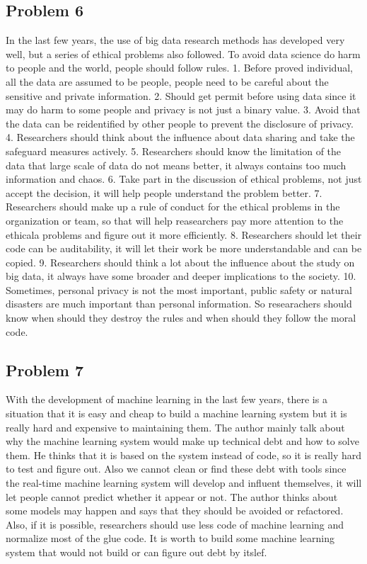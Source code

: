 \documentclass[12pt]{article}
\begin{document}
        \subsection{Problem 6}
			In the last few years, the use of big data research methods has developed very well, but a series of ethical
            problems also followed. To avoid data science do harm to people and the world, people should follow rules.
            1. Before proved individual, all the data are assumed to be people, people need to be careful about the sensitive
            and private information. 2. Should get permit before using data since it may do harm to some people and privacy is
            not just a binary value. 3. Avoid that the data can be reidentified by other people to prevent the disclosure of privacy.
            4. Researchers should think about the influence about data sharing and take the safeguard measures actively. 5. Researchers
            should know the limitation of the data that large scale of data do not means better, it always contains too much information
            and chaos. 6. Take part in the discussion of ethical problems, not just accept the decision, it will help people understand the
            problem better. 7. Researchers should make up a rule of conduct for the ethical problems in the organization or team, so that will
            help reasearchers pay more attention to the ethicala problems and figure out it more efficiently. 8. Researchers should let their
            code can be auditability, it will let their work be more understandable and can be copied. 9. Researchers should think a lot about
            the influence about the study on big data, it always have some broader and deeper implications to the society. 10. Sometimes,
            personal privacy is not the most important, public safety or natural disasters are much important than personal information.
            So researachers should know when should they destroy the rules and when should they follow the moral code.
        \subsection{Problem 7}
			With the development of machine learning in the last few years, there is a situation that it is easy and cheap to build
            a machine learning system but it is really hard and expensive to maintaining them. The author mainly talk about why the
            machine learning system would make up technical debt and how to solve them. He thinks that it is based on the system instead
            of code, so it is really hard to test and figure out. Also we cannot clean or find these debt with tools since the real-time
            machine learning system will develop and influent themselves, it will let people cannot predict whether it appear or not.
            The author thinks about some models may happen and says that they should be avoided or refactored. Also, if it is possible,
            researchers should use less code of machine learning and normalize most of the glue code. It is worth to build some machine
            learning system that would not build or can figure out debt by itslef.
\end{document}
